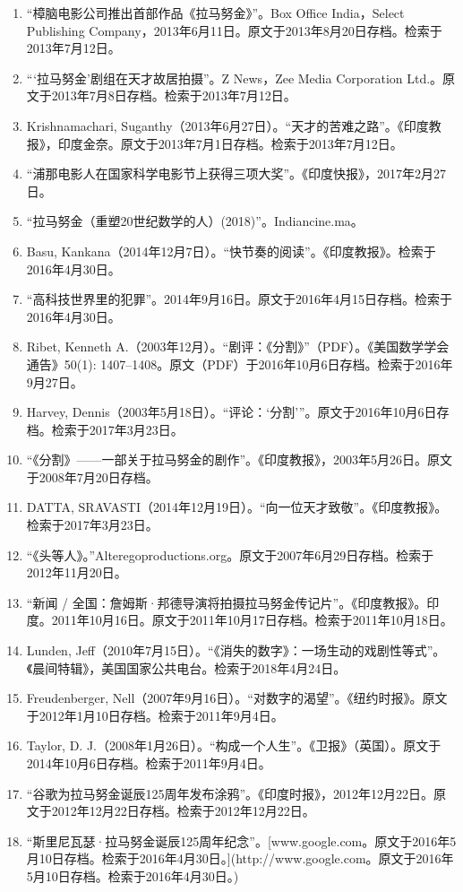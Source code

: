 \begin{enumerate}
\item “樟脑电影公司推出首部作品《拉马努金》”。Box Office India，Select Publishing Company，2013年6月11日。原文于2013年8月20日存档。检索于2013年7月12日。
\item “‘拉马努金’剧组在天才故居拍摄”。Z News，Zee Media Corporation Ltd.。原文于2013年7月8日存档。检索于2013年7月12日。
\item Krishnamachari, Suganthy（2013年6月27日）。“天才的苦难之路”。《印度教报》，印度金奈。原文于2013年7月1日存档。检索于2013年7月12日。
\item “浦那电影人在国家科学电影节上获得三项大奖”。《印度快报》，2017年2月27日。
\item “拉马努金（重塑20世纪数学的人）(2018)”。Indiancine.ma。
\item Basu, Kankana（2014年12月7日）。“快节奏的阅读”。《印度教报》。检索于2016年4月30日。
\item “高科技世界里的犯罪”。2014年9月16日。原文于2016年4月15日存档。检索于2016年4月30日。
\item Ribet, Kenneth A.（2003年12月）。“剧评：《分割》”（PDF）。《美国数学学会通告》50(1): 1407–1408。原文（PDF）于2016年10月6日存档。检索于2016年9月27日。
\item Harvey, Dennis（2003年5月18日）。“评论：‘分割’”。原文于2016年10月6日存档。检索于2017年3月23日。
\item “《分割》——一部关于拉马努金的剧作”。《印度教报》，2003年5月26日。原文于2008年7月20日存档。
\item DATTA, SRAVASTI（2014年12月19日）。“向一位天才致敬”。《印度教报》。检索于2017年3月23日。
\item “《头等人》。”Alteregoproductions.org。原文于2007年6月29日存档。检索于2012年11月20日。
\item “新闻 / 全国：詹姆斯·邦德导演将拍摄拉马努金传记片”。《印度教报》。印度。2011年10月16日。原文于2011年10月17日存档。检索于2011年10月18日。
\item Lunden, Jeff（2010年7月15日）。“《消失的数字》：一场生动的戏剧性等式”。《晨间特辑》，美国国家公共电台。检索于2018年4月24日。
\item Freudenberger, Nell（2007年9月16日）。“对数字的渴望”。《纽约时报》。原文于2012年1月10日存档。检索于2011年9月4日。
\item Taylor, D. J.（2008年1月26日）。“构成一个人生”。《卫报》（英国）。原文于2014年10月6日存档。检索于2011年9月4日。
\item “谷歌为拉马努金诞辰125周年发布涂鸦”。《印度时报》，2012年12月22日。原文于2012年12月22日存档。检索于2012年12月22日。
\item “斯里尼瓦瑟·拉马努金诞辰125周年纪念”。[www.google.com。原文于2016年5月10日存档。检索于2016年4月30日。](http://www.google.com。原文于2016年5月10日存档。检索于2016年4月30日。)

\end{enumerate}
